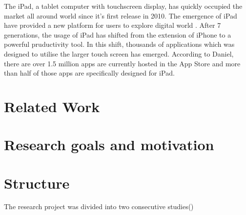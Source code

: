 The iPad, a tablet computer with touchscreen display, has quickly occupied the market all around world since it's first release in 2010\citep{Reference2}. The emergence of iPad have provided a new platform for users to explore digital world \citep{Reference1}. After 7 generations, the usage of iPad has shifted from the extension of iPhone to a powerful pruductivity tool. In this shift, thousands of applications which was designed to utilise the larger touch screen has emerged. According to Daniel, there are over 1.5 million apps are currently hosted in the App Store and more than half of those apps are specifically designed for iPad\citep{lifewire}.


\section{Related Work}

\section{Research goals and motivation}

\section{Structure}

The research project was divided into two consecutive studies()
